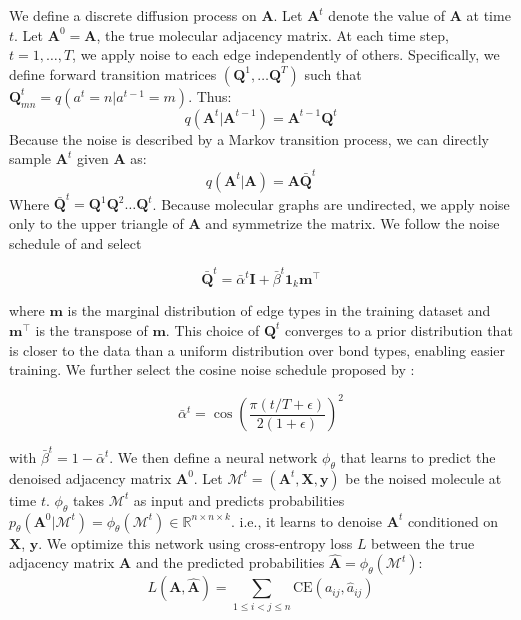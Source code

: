 \documentclass{article}
\theoremstyle{plain}
\theoremstyle{definition}
\theoremstyle{remark}
\begin{document}
We define a discrete diffusion process on $\mathbf{A}$. Let $\mathbf{A}^t$ denote the value of $\mathbf{A}$ at time $t$. Let $\mathbf{A}^0 = \mathbf{A}$, the true molecular adjacency matrix. At each time step, $t = 1, \dots, T$, we apply noise to each edge independently of others. Specifically, we define forward transition matrices $\left(\mathbf{Q}^1, \dots \mathbf{Q}^T\right)$ such that $\mathbf{Q}^t_{mn} = q\left(a^t = n | a^{t-1} = m \right)$. Thus:
\begin{equation}
q(\mathbf{A}^t | \mathbf{A}^{t-1}) = \mathbf{A}^{t-1}\mathbf{Q}^{t}
\end{equation}
Because the noise is described by a Markov transition process, we can directly sample $\mathbf{A}^t$ given $\mathbf{A}$ as:
\begin{equation}
q(\mathbf{A}^t | \mathbf{A}) = \mathbf{A}\mathbf{\bar{Q}}^{t}
\end{equation}
Where $\mathbf{\bar{Q}}^{t} = \mathbf{Q}^1\mathbf{Q}^2\dots \mathbf{Q}^t$. Because molecular graphs are undirected, we apply noise only to the upper triangle of $\mathbf{A}$ and symmetrize the matrix. We follow the noise schedule of \citet{vignac2023digress} and select

\begin{equation}
    \mathbf{\bar{Q}}^t = \bar{\alpha}^t\bm{I} + \bar{\beta}^t\bm{1}_k\bm{m}^\top
\end{equation}

where $\bm{m}$ is the marginal distribution of edge types in the training dataset and $\bm{m}^\top$ is the transpose of $\bm{m}$. This choice of $\mathbf{Q}^t$ converges to a prior distribution that is closer to the data than a uniform distribution over bond types, enabling easier training. We further select the cosine noise schedule proposed by \citet{nichol2021improveddenoisingdiffusionprobabilistic}:

\begin{equation}
    \bar{\alpha}^t = \cos\left(\frac{\pi(t/T + \epsilon)}{2(1+\epsilon)}\right)^2
\end{equation}

with $\bar{\beta}^t = 1 - \bar{\alpha}^t$. We then define a neural network $\phi_{\theta}$ that learns to predict the denoised adjacency matrix $\mathbf{A}^0$. Let $\mathcal{M}^t = \left(\mathbf{A}^t, \mathbf{X}, \mathbf{y}\right)$ be the noised molecule at time $t$. $\phi_{\theta}$ takes $\mathcal{M}^t$ as input and predicts probabilities $p_{\theta}(\mathbf{A}^0 |\mathcal{M}^t) = \phi_\theta(\mathcal{M}^t) \in \mathbb{R}^{n \times n \times k}$. 
i.e., it learns to denoise $\mathbf{A}^t$ conditioned on $\mathbf{X}$, $\mathbf{y}$. We optimize this network using cross-entropy loss $L$ between the true adjacency matrix $\mathbf{A}$ and the predicted probabilities $\hat{\mathbf{A}} = \phi_\theta(\mathcal{M}^t)$:
\begin{equation}
L(\mathbf{A}, \hat{\mathbf{A}}) = \sum_{1 \leq i < j \leq n}\text{CE}\left(a_{ij}, \hat{a}_{ij}\right)
\end{equation}
\end{document}

